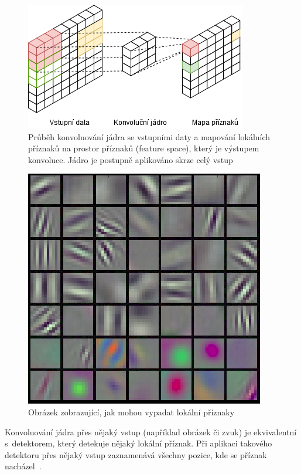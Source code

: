 \begin{figure}[H]
    \centering
    \includegraphics[scale=0.8]{obrazky-figures/convmapping.png}
    \caption{\label{fig:convmapping}Průběh konvoluování jádra se vstupními daty a mapování lokálních příznaků na prostor příznaků (feature space), který je výstupem konvoluce. Jádro je postupně aplikováno skrze celý vstup}
\end{figure}

\begin{figure}[H]
    \centering
    \includegraphics[scale=0.35]{obrazky-figures/features.png}
    \caption{\label{fig:features}Obrázek zobrazující, jak mohou vypadat lokální příznaky}
\end{figure}

Konvoluování jádra přes nějaký vstup (například obrázek či zvuk) je ekvivalentní s~detektorem, který detekuje nějaký lokální příznak. Při aplikaci takového detektoru přes nějaký vstup zaznamenává všechny pozice, kde se příznak nacházel~\cite{mitdeeplearning_small}.

